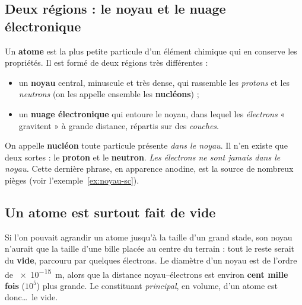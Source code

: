 \documentclass[11pt,a4paper]{article}
\begin{document}
\subsection{Deux régions : le noyau et le nuage électronique}

\begin{definition}[atome]
Un \textbf{atome} est la plus petite particule d'un élément chimique qui en conserve les propriétés.
Il est formé de deux régions très différentes :
\begin{itemize}[leftmargin=1.6em,topsep=2pt,itemsep=1pt]
  \item un \textbf{noyau} central, minuscule et très dense, qui rassemble les \emph{protons} et les
        \emph{neutrons} (on les appelle ensemble les \textbf{nucléons}) ;
  \item un \textbf{nuage électronique} qui entoure le noyau, dans lequel les \emph{électrons}
        « gravitent » à grande distance, répartis sur des \emph{couches}.
\end{itemize}
\end{definition}

\begin{definition}[nucléon]
On appelle \textbf{nucléon} toute particule présente \emph{dans le noyau}. Il n'en existe que deux
sortes : le \textbf{proton} et le \textbf{neutron}. \emph{Les électrons ne sont jamais dans le noyau.}
Cette dernière phrase, en apparence anodine, est la source de nombreux pièges (voir l'exemple~\ref{ex:noyau-sc}).
\end{definition}

\subsection{Un atome est surtout fait de vide}

Si l'on pouvait agrandir un atome jusqu'à la taille d'un grand stade, son noyau n'aurait que la
taille d'une bille placée au centre du terrain : tout le reste serait du \textbf{vide}, parcouru par
quelques électrons. Le diamètre d'un noyau est de l'ordre de \SI{e-15}{\metre}, alors que la distance
noyau–électrons est environ \textbf{cent mille fois} (\(10^5\)) plus grande. Le constituant
\emph{principal}, en volume, d'un atome est donc\dots\ le vide.
\end{document}
